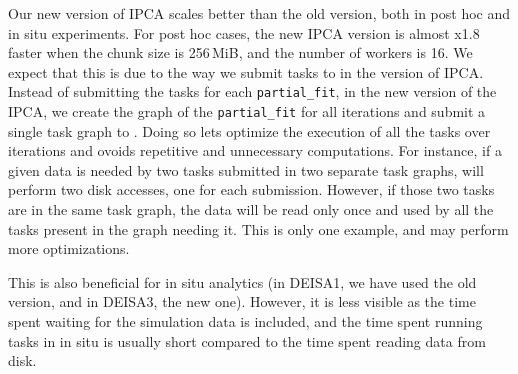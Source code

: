 Our new version of IPCA scales better than the old version, both in post hoc and in situ experiments. For post hoc cases, the new IPCA version is almost x1.8 faster when the chunk size is 256\,MiB, and the number of workers is 16. We expect that this is due to the way we submit tasks to \dask in the version of IPCA.
Instead of submitting the tasks for each \texttt{partial\_fit}, in the new version of the IPCA, we create the graph of the \texttt{partial\_fit} for all iterations and submit a single task graph to \dask. Doing so lets \dask optimize the execution of all the tasks over iterations and ovoids repetitive and unnecessary computations. For instance, if a given data is needed by two tasks submitted in two separate task graphs, \dask will perform two disk accesses, one for each submission. However, if those two tasks are in the same task graph, the data will be read only once and used by all the tasks present in the graph needing it. This is only one example, and \dask may perform more optimizations.    

This is also beneficial for in situ analytics (in DEISA1, we have used the old version, and in DEISA3, the new one). However, it is less visible as the time spent waiting for the simulation data is included, and the time spent running tasks in in situ is usually short compared to the time spent reading data from disk. 


